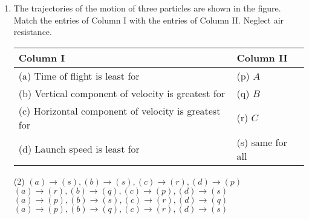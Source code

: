 \documentclass{article}
\renewcommand{\ans}{\quad}
\begin{document}
\begin{enumerate}
    \item The trajectories of the motion of three particles are shown in the figure. Match the entries of Column I with the entries of Column II. Neglect air resistance.
    \begin{center}
    \end{center}
    \begin{center}
        \renewcommand{\arraystretch}{1.5}
        \begin{tabular}{p{8cm}|p{4cm}}
        \hline
        Column I & Column II \\
        \hline
        (a) Time of flight is least for & (p) $A$\\
        (b) Vertical component of velocity is greatest for & (q) $B$\\
        (c) Horizontal component of velocity is greatest for & (r) $C$\\
        (d) Launch speed is least for & (s) same for all\\
        \hline
        \end{tabular}
    \end{center}
    \begin{tasks}(2)
        \task $(a) \rightarrow(s), (b) \rightarrow(s), (c) \rightarrow(r), (d) \rightarrow(p)$\ans
        \task $(a) \rightarrow(r), (b) \rightarrow(q), (c) \rightarrow(p), (d) \rightarrow(s)$
        \task $(a) \rightarrow(p), (b) \rightarrow(s), (c) \rightarrow(r), (d) \rightarrow(q)$
        \task $(a) \rightarrow(p), (b) \rightarrow(q), (c) \rightarrow(r), (d) \rightarrow(s)$
    \end{tasks}


\end{enumerate}
\end{document}
